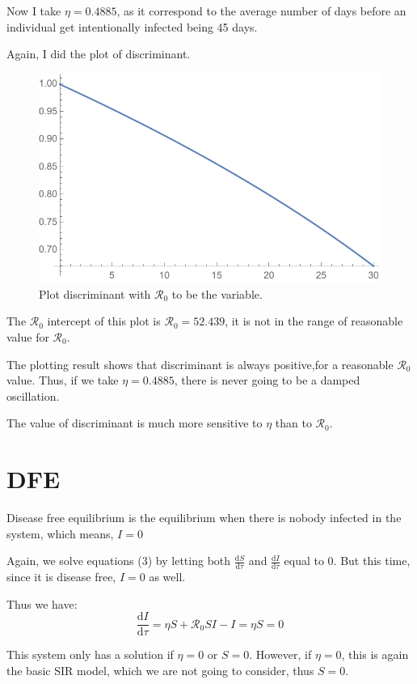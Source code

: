 \documentclass[12pt]{article}
\newcommand\dbyd[2]{\frac{\mathrm d{#1}}{\mathrm d{#2}}}
\newcommand{\R}{\mathcal{R}}
\begin{document}
Now I take $\eta=0.4885$, as it correspond to the average number of days before an individual get intentionally infected being 45 days.

Again, I did the plot of discriminant.

\begin{figure}[H]
  \caption{Plot discriminant with $\R_0$ to be the variable.}
  \includegraphics[width=1\textwidth]{Figures/Plot_R_S.pdf}
\end{figure}

The $\R_0$ intercept of this plot is $\R_0=52.439$, it is not in the range of reasonable value for $\R_0$.

The plotting result shows that discriminant is always positive,for a reasonable $\mathcal{R}_0$ value. Thus, if we take $\eta=0.4885$, there is never going to be a damped oscillation.

The value of discriminant is much more sensitive to $\eta$ than to $\mathcal{R}_0$.

\section{DFE}

Disease free equilibrium is the equilibrium when there is nobody infected in the system, which means, $I=0$

Again, we solve equations (3) by letting both $\dbyd{S}{\tau}$ and $\dbyd{I}{\tau}$ equal to 0. But this time, since it is disease free, $I=0$ as well.

Thus we have:
\begin{equation}
\dbyd{I}{\tau}=\eta S+\mathcal{R}_0 SI-I=\eta S=0
\end{equation}

This system only has a solution if $\eta=0$ or $S=0$. However, if $\eta=0$, this is again the basic SIR model, which we are not going to consider, thus $S=0$.
\end{document}
